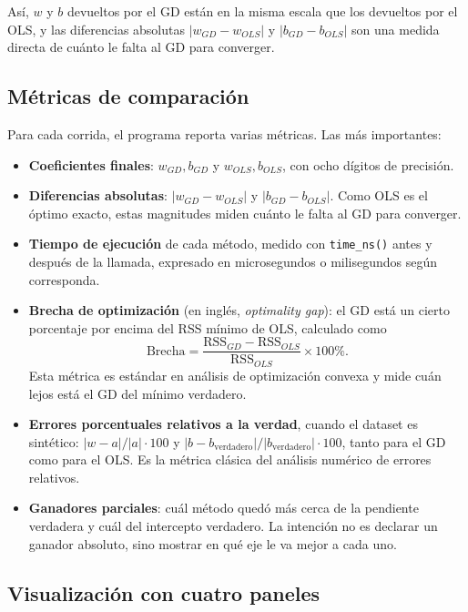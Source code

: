 \documentclass[11pt,a4paper]{article}
\begin{document}
Así, $w$ y $b$ devueltos por el GD están en la misma escala que los devueltos por el OLS, y las diferencias absolutas $|w_{GD} - w_{OLS}|$ y $|b_{GD} - b_{OLS}|$ son una medida directa de cuánto le falta al GD para converger.

\subsection{Métricas de comparación}

Para cada corrida, el programa reporta varias métricas. Las más importantes:

\begin{itemize}
    \item \textbf{Coeficientes finales}: $w_{GD}, b_{GD}$ y $w_{OLS}, b_{OLS}$, con ocho dígitos de precisión.
    \item \textbf{Diferencias absolutas}: $|w_{GD} - w_{OLS}|$ y $|b_{GD} - b_{OLS}|$. Como OLS es el óptimo exacto, estas magnitudes miden cuánto le falta al GD para converger.
    \item \textbf{Tiempo de ejecución} de cada método, medido con \texttt{time\_ns()} antes y después de la llamada, expresado en microsegundos o milisegundos según corresponda.
    \item \textbf{Brecha de optimización} (en inglés, \textit{optimality gap}): el GD está un cierto porcentaje por encima del RSS mínimo de OLS, calculado como
    \begin{equation}
    \mathrm{Brecha} = \frac{\mathrm{RSS}_{GD} - \mathrm{RSS}_{OLS}}{\mathrm{RSS}_{OLS}} \times 100\%.
    \end{equation}
    Esta métrica es estándar en análisis de optimización convexa y mide cuán lejos está el GD del mínimo verdadero.
    \item \textbf{Errores porcentuales relativos a la verdad}, cuando el dataset es sintético: $|w - a| / |a| \cdot 100$ y $|b - b_{\text{verdadero}}| / |b_{\text{verdadero}}| \cdot 100$, tanto para el GD como para el OLS. Es la métrica clásica del análisis numérico de errores relativos.
    \item \textbf{Ganadores parciales}: cuál método quedó más cerca de la pendiente verdadera y cuál del intercepto verdadero. La intención no es declarar un ganador absoluto, sino mostrar en qué eje le va mejor a cada uno.
\end{itemize}

\subsection{Visualización con cuatro paneles}
\end{document}
